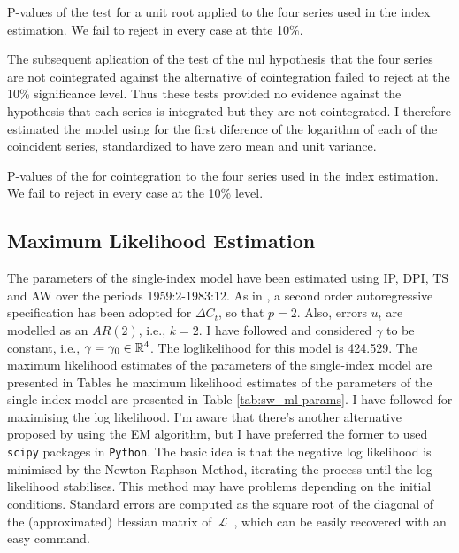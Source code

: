 	\begin{table}[h!]
		\centering\small
		\captionsetup{width=0.6\textwidth, font=small}
		\caption{P-values of the test \protect{} for a unit root applied to the four series used in the index estimation. We fail to reject in every case at thte 10\%.}\label{tab:df_pvalues}
		\vspace{0cm}
		
	\end{table}
 
	The subsequent aplication of the  test of the nul hypothesis that the four series are not cointegrated against the alternative of cointegration failed to reject at the 10\% significance level. Thus these tests provided no evidence against the hypothesis that each series is integrated but they are not cointegrated. I therefore estimated the model using for the first diference of the logarithm of each of the coincident series, standardized to have zero mean and unit variance.

	\begin{table}[h!]
		\centering\small
		\captionsetup{width=0.6\textwidth, font=small}
		\caption{P-values of the \protect\cite{engle1987co} for cointegration to the four series used in the index estimation. We fail to reject in every case at the 10\% level.}
		
	\end{table}

\subsection{Maximum Likelihood Estimation}

The parameters of the single-index model have been estimated using IP, DPI, TS and AW over the periods 1959:2-1983:12. As in , a second order autoregressive  specification  has been adopted for $\Delta C_t$, so that $p=2$. Also, errors $u_t$ are modelled as an $AR(2)$, i.e., $k=2$. I have followed  and considered $\gamma$ to be constant, i.e., $\gamma = \gamma_0\in\mathbb{R}^4$. The loglikelihood for this model is 424.529. The maximum likelihood estimates of the parameters of the single-index model are presented in Tables  he maximum likelihood estimates of the parameters of the single-index model are presented in Table \ref{tab:sw_ml-params}. I have followed  for maximising the log likelihood. I'm aware that there's another alternative proposed by  using the EM algorithm, but I have preferred the former to used \texttt{scipy} packages in \texttt{Python}. The basic idea is that the negative log likelihood is minimised by the Newton-Raphson Method, iterating the process until the log likelihood stabilises. This method may have problems depending on the initial conditions. Standard errors are computed as the square root of the diagonal of the (approximated) Hessian matrix of~$\mathcal{L}$~\cite{shumway2019time}, which can be easily recovered with an easy command.

